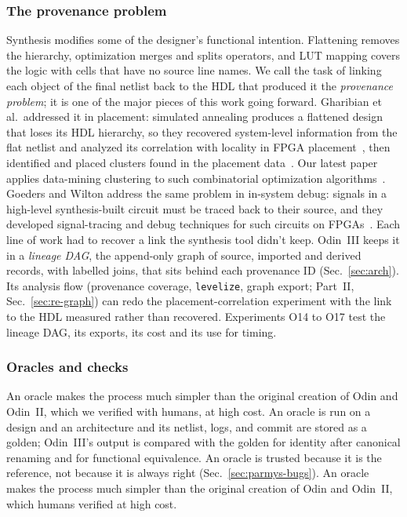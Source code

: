 \documentclass[conference]{IEEEtran}
\newcommand{\code}[1]{\texttt{#1}}
\begin{document}
\subsubsection*{The provenance problem}


Synthesis modifies some of the designer's functional intention. Flattening removes the hierarchy, optimization merges and splits operators, and LUT mapping covers the logic with cells that have no source line names. We call the task of linking each object of the final netlist back to the HDL that produced it the \emph{provenance problem}; it is one of the major pieces of this work going forward. Gharibian et al.\ addressed it in placement: simulated annealing produces a flattened design that loses its HDL hierarchy, so they recovered system-level information from the flat netlist and analyzed its correlation with locality in FPGA placement~, then identified and placed clusters found in the placement data~. Our latest paper applies data-mining clustering to such combinatorial optimization algorithms~. Goeders and Wilton address the same problem in in-system debug: signals in a high-level synthesis-built circuit must be traced back to their source, and they developed signal-tracing and debug techniques for such circuits on FPGAs~. Each line of work had to recover a link the synthesis tool didn't keep. Odin~III keeps it in a \emph{lineage DAG}, the append-only graph of source, imported and derived records, with labelled joins, that sits behind each provenance ID (Sec.~\ref{sec:arch}).
Its analysis flow (provenance coverage, \code{levelize}, graph export; Part~II, Sec.~\ref{sec:re-graph}) can redo the placement-correlation experiment with the link to the HDL measured rather than recovered. Experiments O14 to O17 test the lineage DAG, its exports, its cost and its use for timing.

\subsubsection*{Oracles and checks}

An oracle makes the process much simpler than the original creation of Odin and Odin~II, which we verified with humans, at high cost. An oracle is run on a design and an architecture and its netlist, logs, and commit are stored as a golden; Odin~III's output is compared with the golden for identity after canonical renaming and for functional equivalence. An oracle is trusted because it is the reference, not because it is always right (Sec.~\ref{sec:parmys-bugs}). An oracle makes the process much simpler than the original creation of Odin and Odin~II, which humans verified at high cost.
\end{document}
